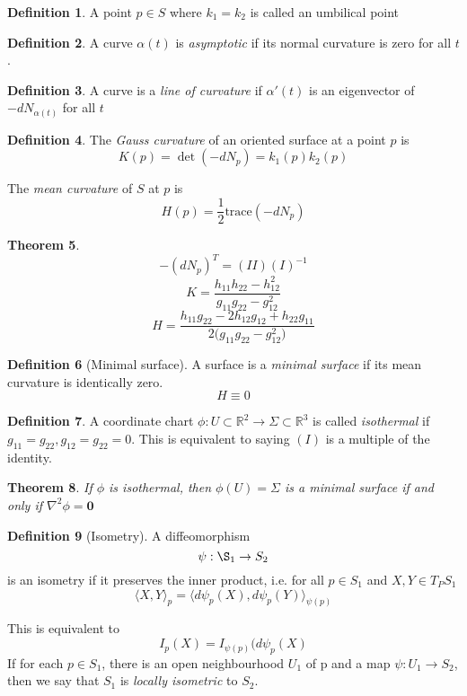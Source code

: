 \documentclass[10pt, oneside, reqno]{amsart}
\newcommand{\R}{\mathbb{R}}
\theoremstyle{plain}%
\newtheorem{thm}{Theorem}[section]
\theoremstyle{definition}
\newtheorem{defn}[thm]{Definition}
\theoremstyle{remark}
\begin{document}
\begin{defn}
    A point $p \in S$ where $k_1 = k_2$ is called an umbilical point
\end{defn}

\begin{defn}
    A curve $\alpha(t)$ is \emph{asymptotic} if its normal curvature is zero for all $t$.
\end{defn}

\begin{defn}
    A curve is a \emph{line of curvature} if $\alpha'(t)$ is an eigenvector of $-dN_{\alpha(t)}$ for all $t$
\end{defn}
\begin{defn}
    The \emph{Gauss curvature} of an oriented surface at a point $p$ is \[
        K(p) = \det(-dN_p) = k_1(p) k_2(p)
    \]
    
    The \emph{mean curvature} of $S$ at $p$ is \[
        H(p) = \frac{1}{2} \text{trace} (-dN_p)
    \]
\end{defn}


\begin{thm}
    \[
    -(dN_p)^T = (II)(I)^{-1}    
    \]
    \[
        K = \frac{h_{11}h_{22}-{h^2_{12}}}{g_{11}g_{22}-g^2_{12}}
    \]
    \[
        H = \frac{h_{11}g_{22}-2h_{12}g_{12}+h_{22}g_{11}}{2 ({g_{11}g_{22}-g^2_{12})}}
    \]
\end{thm}

\begin{defn}[Minimal surface]
    A surface is a \emph{minimal surface} if its mean curvature is identically zero. \[
        H \equiv 0
    \]
\end{defn}

\begin{defn}
    A coordinate chart $\phi: U \subset \R^2 \rightarrow \Sigma \subset \R^3$ is called \emph{isothermal} if $g_{11} = g_{22}, g_{12} = g_{22} = 0$.  This is equivalent to saying $(I)$ is a multiple of the identity.
\end{defn}

\begin{thm}
    If $\phi$ is isothermal, then $\phi(U) = \Sigma$ is a minimal surface if and only if $\nabla^2 \phi = \mathbf{0}$
\end{thm}

\begin{defn}[Isometry]
    A diffeomorphism \[
        \psi: \S_1 \rightarrow S_2 
    \]
    is an isometry if it preserves the inner product, i.e. for all $p \in S_1$ and $X,Y \in T_P S_1$ \[
        \langle X,Y \rangle_p = \langle d \psi_p(X),d \psi_p(Y) \rangle_{\psi(p)}
    \]
    
    This is equivalent to \[
        I_p(X) = I_{\psi(p)} (d\psi_p(X)
    \]
    If for each $p \in S_1$, there is an open neighbourhood $U_1$ of p and a map $\psi : U_1 \rightarrow S_2$, then we say that $S_1$ is \emph{locally isometric} to $S_2$.
\end{defn}
\end{document}

